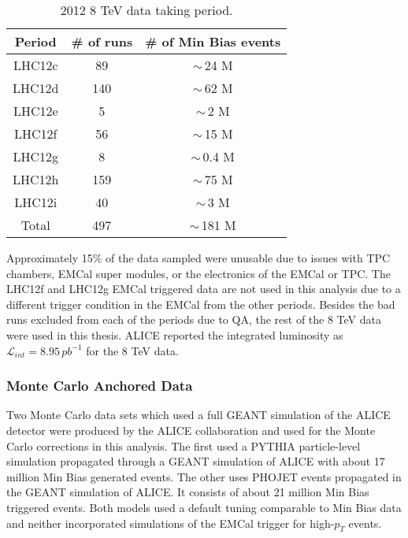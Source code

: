 \begin{table}[hb]
\label{tab:RunSummary}
\begin{center}
\caption{2012 8 TeV data taking period.}
\begin{tabular}[b]{|c|c|c|}
	\hline
	Period & \# of runs & \# of Min Bias events \\ \hline
	LHC12c & 89 & $\sim \,$24 M \\ \hline
	LHC12d & 140 & $\sim \,$62 M \\ \hline
	LHC12e & 5 & $\sim \,$2 M \\ \hline
	LHC12f & 56 & $\sim \,$15 M \\ \hline
	LHC12g & 8 & $\sim \,$0.4 M \\ \hline
	LHC12h & 159 & $\sim \,$75 M \\ \hline
	LHC12i & 40 & $\sim \,$3 M \\ \hline
	Total & 497 & $\sim \,$181 M \\ \hline

\end{tabular}
\end{center}

\end{table}

Approximately 15\% of the data sampled were unusable due to issues with TPC chambers, EMCal super modules, or the electronics of the EMCal or TPC.  The LHC12f and LHC12g EMCal triggered data are not used in this analysis due to a different trigger condition in the EMCal from the other periods.  Besides the bad runs excluded from each of the periods due to QA, the rest of the 8 TeV data were used in this thesis.  ALICE reported the integrated luminosity as $\mathscr{L}_{int} = 8.95 \, pb^{-1}$ for the 8 TeV data\cite{ALICE-PUBLIC-2017-002}.

\subsubsection{Monte Carlo Anchored Data}
Two Monte Carlo data sets which used a full GEANT simulation of the ALICE detector were produced by the ALICE collaboration and used for the Monte Carlo corrections in this analysis.   The first used a PYTHIA particle-level simulation propagated through a GEANT simulation of ALICE with about 17 million Min Bias generated events. The other uses PHOJET events propagated in the GEANT simulation of ALICE.  It consists of about 21 million Min Bias triggered events.  Both models used a default tuning comparable to Min Bias data and neither incorporated simulations of the EMCal trigger for high-$p_{T}$ events.

